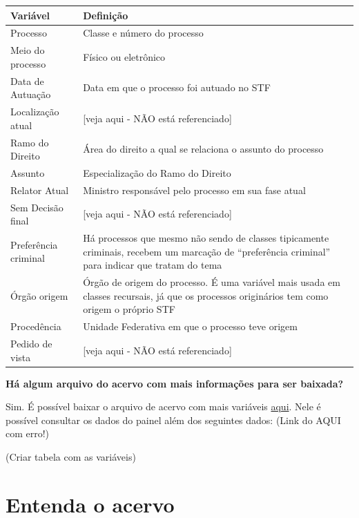 \documentclass[
]{book}
\begin{document}
\begin{longtable}[]{@{}
  >{\raggedright\arraybackslash}p{}
  >{\raggedright\arraybackslash}p{}@{}}
\toprule
Variável & Definição \\
\midrule
\endhead
Processo & Classe e número do processo \\
Meio do processo & Físico ou eletrônico \\
Data de Autuação & Data em que o processo foi autuado no STF \\
Localização atual & {[}veja aqui - NÃO está referenciado{]} \\
Ramo do Direito & Área do direito a qual se relaciona o assunto do processo \\
Assunto & Especialização do Ramo do Direito \\
Relator Atual & Ministro responsável pelo processo em sua fase atual \\
Sem Decisão final & {[}veja aqui - NÃO está referenciado{]} \\
Preferência criminal & Há processos que mesmo não sendo de classes tipicamente criminais, recebem um marcação de ``preferência criminal'' para indicar que tratam do tema \\
Órgão origem & Órgão de origem do processo. É uma variável mais usada em classes recursais, já que os processos originários tem como origem o próprio STF \\
Procedência & Unidade Federativa em que o processo teve origem \\
Pedido de vista & {[}veja aqui - NÃO está referenciado{]} \\
\bottomrule
\end{longtable}

\textbf{Há algum arquivo do acervo com mais informações para ser baixada?}

Sim. É possível baixar o arquivo de acervo com mais variáveis \href{http://www.stf.jus.br/arquivo/cms/publicacaoBOInternet/anexo/acervo/Acervo_STF_Lista_Geral.xlsx}{aqui}. Nele é possível consultar os dados do painel além dos seguintes dados: (Link do AQUI com erro!)

(Criar tabela com as variáveis)

\hypertarget{entenda-o-acervo}{%
\section{Entenda o acervo}\label{entenda-o-acervo}}
\end{document}
